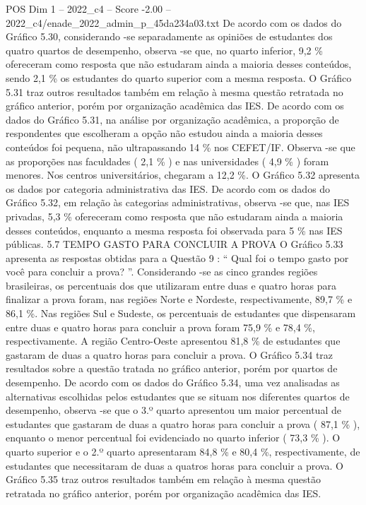 \begin{textsample}{POS Dim 1 – 2022\_c4 – Score -2.00 – 2022\_c4/enade\_2022\_admin\_p\_45da234a03.txt}
De acordo com os dados do Gráfico 5.30, considerando -se separadamente as opiniões de estudantes dos quatro quartos de desempenho, observa -se que, no quarto inferior, 9,2 \% ofereceram como resposta que não estudaram ainda a maioria desses conteúdos, sendo 2,1 \% os estudantes do quarto superior com a mesma resposta.
O Gráfico 5.31 traz outros resultados também em relação à mesma questão retratada no gráfico anterior, porém por organização acadêmica das IES.
De acordo com os dados do Gráfico 5.31, na análise por organização acadêmica, a proporção de respondentes que escolheram a opção não estudou ainda a maioria desses conteúdos foi pequena, não ultrapassando 14 \% nos CEFET/IF.
Observa -se que as proporções nas faculdades ( 2,1 \% ) e nas universidades ( 4,9 \% ) foram menores.
Nos centros universitários, chegaram a 12,2 \%.
O Gráfico 5.32 apresenta os dados por categoria administrativa das IES.
De acordo com os dados do Gráfico 5.32, em relação às categorias administrativas, observa -se que, nas IES privadas, 5,3 \% ofereceram como resposta que não estudaram ainda a maioria desses conteúdos, enquanto a mesma resposta foi observada para 5 \% nas IES públicas. 5.7 TEMPO GASTO PARA CONCLUIR A PROVA O Gráfico 5.33 apresenta as respostas obtidas para a Questão 9 : “ Qual foi o tempo gasto por você para concluir a prova? ”.
Considerando -se as cinco grandes regiões brasileiras, os percentuais dos que utilizaram entre duas e quatro horas para finalizar a prova foram, nas regiões Norte e Nordeste, respectivamente, 89,7 \% e 86,1 \%.
Nas regiões Sul e Sudeste, os percentuais de estudantes que dispensaram entre duas e quatro horas para concluir a prova foram 75,9 \% e 78,4 \%, respectivamente.
A região Centro-Oeste apresentou 81,8 \% de estudantes que gastaram de duas a quatro horas para concluir a prova.
O Gráfico 5.34 traz resultados sobre a questão tratada no gráfico anterior, porém por quartos de desempenho.
De acordo com os dados do Gráfico 5.34, uma vez analisadas as alternativas escolhidas pelos estudantes que se situam nos diferentes quartos de desempenho, observa -se que o 3.º quarto apresentou um maior percentual de estudantes que gastaram de duas a quatro horas para concluir a prova ( 87,1 \% ), enquanto o menor percentual foi evidenciado no quarto inferior ( 73,3 \% ).
O quarto superior e o 2.º quarto apresentaram 84,8 \% e 80,4 \%, respectivamente, de estudantes que necessitaram de duas a quatros horas para concluir a prova.
O Gráfico 5.35 traz outros resultados também em relação à mesma questão retratada no gráfico anterior, porém por organização acadêmica das IES.

\end{textsample}
